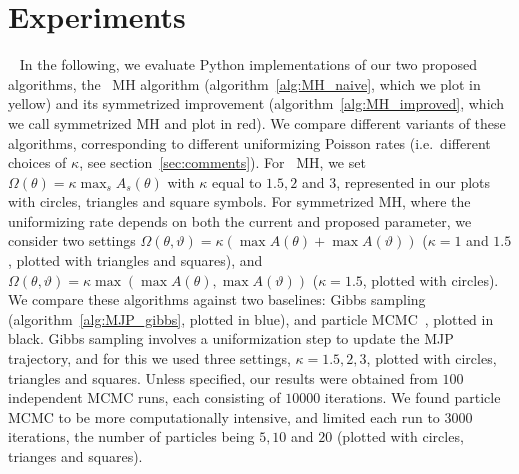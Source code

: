 
\section{Experiments}\label{sec:expts}~
In the following, we evaluate Python implementations of our two proposed
algorithms, the \naive\ MH algorithm (algorithm~\ref{alg:MH_naive}, which we
plot in yellow) and its symmetrized improvement (algorithm~\ref{alg:MH_improved}, 
which we call symmetrized MH and plot in red). We compare different variants of 
these algorithms, corresponding to different uniformizing Poisson rates 
(i.e.\ different choices of $\kappa$, see section~\ref{sec:comments}). For 
\naive\ MH, %
we set $\Omega(\theta) = \kappa \max_s A_s(\theta) $ with $\kappa$  equal to 
$1.5, 2$ and $3$, represented in our plots with circles, triangles and square
symbols. For symmetrized MH, %
where the uniformizing rate depends 
on both the current and proposed parameter, we consider two settings
 $\Omega(\theta, \vartheta) = \kappa (\max A(\theta) + \max A(\vartheta))$ 
 ($\kappa = 1$ and $1.5$, plotted with {triangles} and {squares}), and 
$\Omega(\theta, \vartheta) = \kappa \max(\max A(\theta), \max A(\vartheta))$
($\kappa=1.5$, plotted with {circles}).  We compare these
algorithms against two baselines: Gibbs sampling (algorithm~\ref{alg:MJP_gibbs},
plotted in blue), and particle MCMC~\cite{Andrieu10}, plotted in black. Gibbs
sampling involves a uniformization step to update the MJP trajectory, and for this
we used three settings, $\kappa=1.5,2,3$, plotted with circles, {triangles}
and {squares}.  Unless specified, our results were
obtained from $100$ independent MCMC runs, each consisting of $10000$ iterations.
We found particle MCMC to be more computationally intensive, and limited each 
run to $3000$ iterations, the number of particles being $5, 10$ and $20$ 
(plotted with circles, trianges and squares). 


